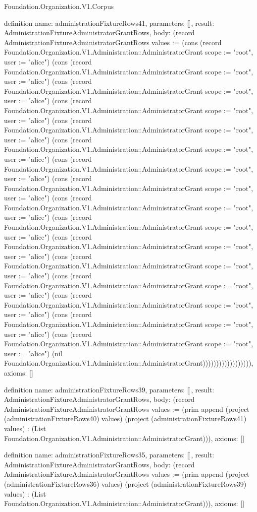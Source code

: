 \begin{lexlean}{Foundation.Organization.V1.Corpus}
\begin{semanticmodule}
definition{
  name: administrationFixtureRows41,
  parameters: [],
  result: AdministrationFixtureAdministratorGrantRows,
  body: (record AdministrationFixtureAdministratorGrantRows {values := (cons (record Foundation.Organization.V1.Administration::AdministratorGrant {scope := "root", user := "alice"}) (cons (record Foundation.Organization.V1.Administration::AdministratorGrant {scope := "root", user := "alice"}) (cons (record Foundation.Organization.V1.Administration::AdministratorGrant {scope := "root", user := "alice"}) (cons (record Foundation.Organization.V1.Administration::AdministratorGrant {scope := "root", user := "alice"}) (cons (record Foundation.Organization.V1.Administration::AdministratorGrant {scope := "root", user := "alice"}) (cons (record Foundation.Organization.V1.Administration::AdministratorGrant {scope := "root", user := "alice"}) (cons (record Foundation.Organization.V1.Administration::AdministratorGrant {scope := "root", user := "alice"}) (cons (record Foundation.Organization.V1.Administration::AdministratorGrant {scope := "root", user := "alice"}) (cons (record Foundation.Organization.V1.Administration::AdministratorGrant {scope := "root", user := "alice"}) (cons (record Foundation.Organization.V1.Administration::AdministratorGrant {scope := "root", user := "alice"}) (cons (record Foundation.Organization.V1.Administration::AdministratorGrant {scope := "root", user := "alice"}) (cons (record Foundation.Organization.V1.Administration::AdministratorGrant {scope := "root", user := "alice"}) (cons (record Foundation.Organization.V1.Administration::AdministratorGrant {scope := "root", user := "alice"}) (cons (record Foundation.Organization.V1.Administration::AdministratorGrant {scope := "root", user := "alice"}) (cons (record Foundation.Organization.V1.Administration::AdministratorGrant {scope := "root", user := "alice"}) (cons (record Foundation.Organization.V1.Administration::AdministratorGrant {scope := "root", user := "alice"}) (nil Foundation.Organization.V1.Administration::AdministratorGrant)))))))))))))))))}),
  axioms: []
}

definition{
  name: administrationFixtureRows39,
  parameters: [],
  result: AdministrationFixtureAdministratorGrantRows,
  body: (record AdministrationFixtureAdministratorGrantRows {values := (prim append (project (administrationFixtureRows40) values) (project (administrationFixtureRows41) values) : (List Foundation.Organization.V1.Administration::AdministratorGrant))}),
  axioms: []
}

definition{
  name: administrationFixtureRows35,
  parameters: [],
  result: AdministrationFixtureAdministratorGrantRows,
  body: (record AdministrationFixtureAdministratorGrantRows {values := (prim append (project (administrationFixtureRows36) values) (project (administrationFixtureRows39) values) : (List Foundation.Organization.V1.Administration::AdministratorGrant))}),
  axioms: []
}


\end{semanticmodule}
\end{lexlean}
